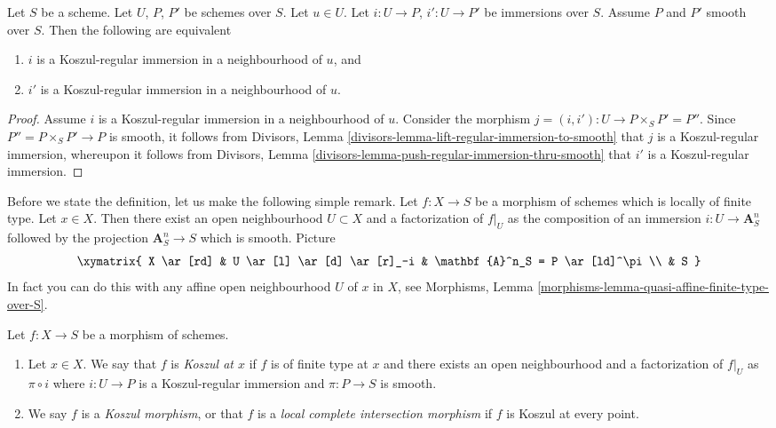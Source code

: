 \begin{lemma}
\label{lemma-koszul-independence-factorization}
Let $S$ be a scheme. Let $U$, $P$, $P'$ be schemes over $S$.
Let $u \in U$. Let $i : U \to P$, $i' : U \to P'$ be immersions over $S$.
Assume $P$ and $P'$ smooth over $S$. Then the following are equivalent
\begin{enumerate}
\item $i$ is a Koszul-regular immersion in a neighbourhood of $u$, and
\item $i'$ is a Koszul-regular immersion in a neighbourhood of $u$.
\end{enumerate}
\end{lemma}

\begin{proof}
Assume $i$ is a Koszul-regular immersion in a neighbourhood of $u$.
Consider the morphism $j = (i, i') : U \to P \times_S P' = P''$.
Since $P'' = P \times_S P' \to P$ is smooth, it follows from
Divisors, Lemma \ref{divisors-lemma-lift-regular-immersion-to-smooth}
that $j$ is a Koszul-regular immersion, whereupon it follows from
Divisors, Lemma \ref{divisors-lemma-push-regular-immersion-thru-smooth}
that $i'$ is a Koszul-regular immersion.
\end{proof}

\noindent
Before we state the definition, let us make the following simple
remark. Let $f : X \to S$ be a morphism of schemes which is locally
of finite type. Let $x \in X$. Then there exist an open neighbourhood
$U \subset X$ and a factorization of $f|_U$ as the composition of an
immersion $i : U \to \mathbf{A}^n_S$ followed by the projection
$\mathbf{A}^n_S \to S$ which is smooth. Picture
$$
\xymatrix{
X \ar[rd] & U \ar[l] \ar[d] \ar[r]_-i & \mathbf{A}^n_S = P \ar[ld]^\pi \\
& S
}
$$
In fact you can do this with any affine open neighbourhood
$U$ of $x$ in $X$, see
Morphisms, Lemma \ref{morphisms-lemma-quasi-affine-finite-type-over-S}.

\begin{definition}
\label{definition-lci}
Let $f : X \to S$ be a morphism of schemes.
\begin{enumerate}
\item Let $x \in X$. We say that $f$ is {\it Koszul at $x$} if $f$
is of finite type at $x$ and there exists an open neighbourhood
and a factorization of $f|_U$ as $\pi \circ i$ where $i : U \to P$
is a Koszul-regular immersion and $\pi : P \to S$ is smooth.
\item We say $f$ is a {\it Koszul morphism}, or that
$f$ is a {\it local complete intersection morphism}
if $f$ is Koszul at every point.
\end{enumerate}
\end{definition}

